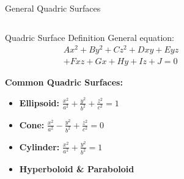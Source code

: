 \begin{frame}{General Quadric Surfaces}
    \begin{columns}
        \begin{column}{0.6\textwidth}
            \begin{mathbox}{Quadric Surface Definition}
                General equation:
                \begin{align*}
                    Ax^2 + By^2 + Cz^2 + Dxy + Eyz \\ + Fxz
                    + Gx + Hy + Iz + J = 0
                \end{align*}
                
                \textbf{Common Quadric Surfaces:}
                \begin{itemize}
                    \item \textbf{Ellipsoid:} $\frac{x^2}{a^2} + \frac{y^2}{b^2} + \frac{z^2}{c^2} = 1$
                    \item \textbf{Cone:} $\frac{x^2}{a^2} - \frac{y^2}{b^2} + \frac{z^2}{c^2} = 0$
                    \item \textbf{Cylinder:} $\frac{x^2}{a^2} + \frac{y^2}{b^2} = 1$
                    \item \textbf{Hyperboloid \& Paraboloid}
                \end{itemize}
            \end{mathbox}
        \end{column}
        \begin{column}{0.4\textwidth}
\end{column}
\end{columns}
\end{frame}
